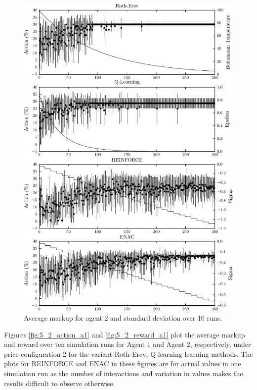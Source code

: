 {	\begin{figure}
	  \centering
	  \includegraphics{figures/fig5_1_action_a2}
	  \caption{Average markup for agent 2 and standard deviation over 10 runs.}
	  \label{fig:5_1_action_a2}
	\end{figure}
}{}

Figures \ref{fig:5_2_action_a1} and \ref{fig:5_2_reward_a1} plot the average
markup and reward over ten simulation runs for Agent 1 and Agent 2,
respectively, under price configuration 2 for the variant Roth-Erev,
Q-learning learning methods.  The plots for REINFORCE and ENAC in these figures
are for actual values in one simulation run as the number of interactions and
variation in values makes the results difficult to observe otherwise.

